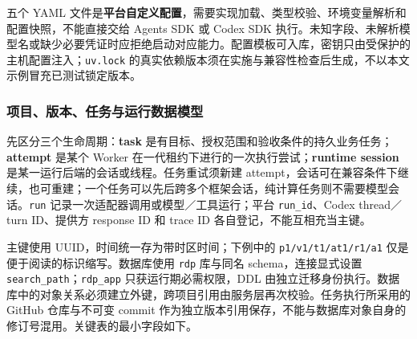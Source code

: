 \documentclass[11pt,a4paper]{article}
\begin{document}
五个 YAML 文件是\textbf{平台自定义配置}，需要实现加载、类型校验、环境变量解析和配置快照，不能直接交给 Agents SDK 或 Codex SDK 执行。未知字段、未解析模型名或缺少必要凭证时应拒绝启动对应能力。配置模板可入库，密钥只由受保护的主机配置注入；\texttt{uv.lock} 的真实依赖版本须在实施与兼容性检查后生成，不以本文示例冒充已测试锁定版本。

\subsubsection{项目、版本、任务与运行数据模型}

先区分三个生命周期：\textbf{task} 是有目标、授权范围和验收条件的持久业务任务；\textbf{attempt} 是某个 Worker 在一代租约下进行的一次执行尝试；\textbf{runtime session} 是某一运行后端的会话或线程。任务重试须新建 attempt，会话可在兼容条件下继续，也可重建；一个任务可以先后跨多个框架会话，纯计算任务则不需要模型会话。\texttt{run} 记录一次适配器调用或模型／工具运行；平台 \texttt{run\_id}、Codex thread／turn ID、提供方 response ID 和 trace ID 各自登记，不能互相充当主键。

主键使用 UUID，时间统一存为带时区时间；下例中的 \texttt{p1/v1/t1/at1/r1/a1} 仅是便于阅读的标识缩写。数据库使用 \texttt{rdp} 库与同名 schema，连接显式设置 \texttt{search\_path}；\texttt{rdp\_app} 只获运行期必需权限，DDL 由独立迁移身份执行。数据库中的对象关系必须建立外键，跨项目引用由服务层再次校验。任务执行所采用的 GitHub 仓库与不可变 commit 作为独立版本引用保存，不能与数据库对象自身的修订号混用。关键表的最小字段如下。
\end{document}
